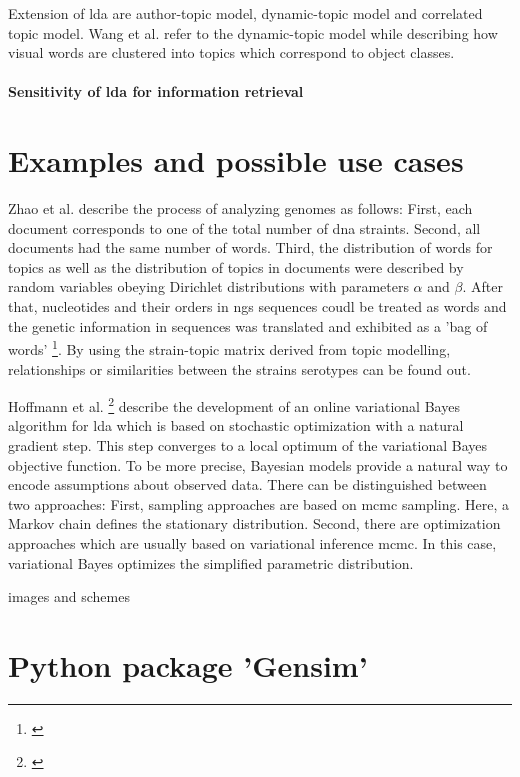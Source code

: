 Extension of \gls{lda} are author-topic model, dynamic-topic model and correlated topic model. Wang et al. refer to the dynamic-topic model while describing how visual words are clustered into topics which correspond to object classes.

\paragraph{Sensitivity of \gls{lda} for information retrieval}


 
\section{Examples and possible use cases}\label{lda_examples}

Zhao et al. describe the process of analyzing genomes as follows: First, each document corresponds to one of the total number of \gls{dna} straints. Second, all documents had the same number of words. Third, the distribution of words for topics as well as the distribution of topics in documents were described by random variables obeying Dirichlet distributions with parameters $\alpha$ and $\beta$. After that, nucleotides and their orders in \gls{ngs} sequences coudl be treated as words and the genetic information in sequences was translated and exhibited as a 'bag of words'  \footnote{\autocite{zhao_2016}}. By using the strain-topic matrix derived from topic modelling, relationships or similarities between the strains serotypes can be found out. 

Hoffmann et al. \footnote{\autocite{hoffmann_2010}} describe the development of an online variational Bayes algorithm for \gls{lda} which is based on stochastic optimization with a natural gradient step. This step converges to a local optimum of the variational Bayes objective function.
To be more precise, Bayesian models provide a natural way to encode assumptions about observed data.
There can be distinguished between two approaches: First, sampling approaches are based on \gls{mcmc} sampling. Here, a Markov chain defines the stationary distribution.
Second, there are optimization approaches which are usually based on variational inference \gls{mcmc}. In this case, variational Bayes optimizes the simplified parametric distribution.

 
images and schemes
\section{Python package 'Gensim'}\label{gensim}
              
